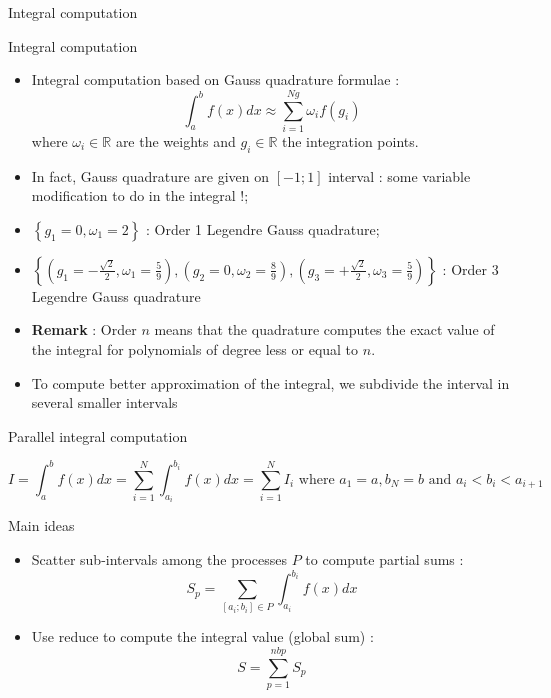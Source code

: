 \documentclass[compress,10pt,aspectratio=169]{beamer}
\begin{document}
\begin{frame}[fragile]{Integral computation}
  \scriptsize
  \begin{block}{\small Integral computation}
    \begin{itemize}
    \item Integral computation based on Gauss quadrature formulae :
      \[
      \int_{a}^{b}f(x)dx \approx \sum_{i=1}^{Ng} \omega_{i}f(g_{i})
      \]
      where $\omega_{i}\in\mathbb{R}$ are the weights  and $g_{i}\in\mathbb{R}$ the integration points.
    \item In fact, Gauss quadrature are given on $[-1;1]$ interval : some variable modification to do in the integral !;
    \item $\left\{ g_{1}=0, \omega_{1}=2 \right\}$ : Order 1 Legendre Gauss quadrature;
    \item $\left\{ \left( g_{1}=-\frac{\sqrt{2}}{2}, \omega_{1}=\frac{5}{9} \right), \left( g_{2}=0, \omega_{2}=\frac{8}{9} \right), \left( g_{3}=+\frac{\sqrt{2}}{2}, \omega_{3}=\frac{5}{9} \right) \right\}$ : Order 3 Legendre Gauss quadrature
    \item \textbf{Remark} : Order $n$ means that the quadrature computes the exact value of the integral for polynomials of degree less or equal to $n$.
    \item To compute better approximation of the integral, we subdivide the interval in several smaller intervals
    \end{itemize}
  \end{block}
\end{frame}

\begin{frame}[fragile]{Parallel integral computation}
  \scriptsize
  \begin{center}
    \[
    I = \int_{a}^{b}f(x)dx = \sum_{i=1}^{N}\int_{a_{i}}^{b_{i}}f(x)dx = \sum_{i=1}^{N} I_{i} \mbox{ where } a_{1}=a, b_{N} = b\mbox{ and } a_{i} < b_{i} < a_{i+1}
    \]
  \end{center}
  \begin{block}{\small Main ideas}
    \begin{itemize}
  \item Scatter sub-intervals among the processes $P$ to compute partial sums :
    \[
    S_{p} = \sum_{[a_{i};b_{i}] \in P} \int_{a_{i}}^{b_{i}} f(x)dx
    \]
  \item Use reduce to compute the integral value (global sum) :
    \[ S = \sum_{p=1}^{nbp} S_{p} \]
    \end{itemize}
  \end{block}
\end{frame}
\end{document}
